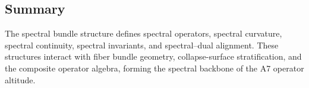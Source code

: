 \subsection{Summary}
The spectral bundle structure defines spectral operators, spectral curvature,
spectral continuity, spectral invariants, and spectral–dual alignment. These
structures interact with fiber bundle geometry, collapse-surface stratification,
and the composite operator algebra, forming the spectral backbone of the A7
operator altitude.

